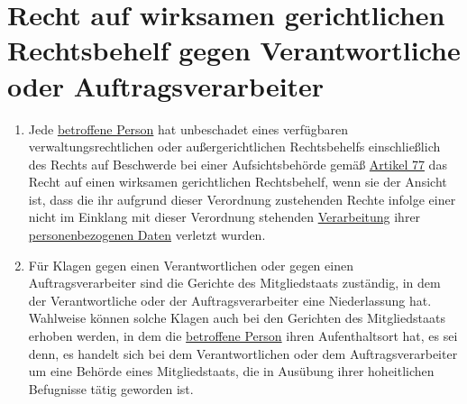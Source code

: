 \chapter{Recht auf wirksamen gerichtlichen Rechtsbehelf gegen Verantwortliche oder Auftragsverarbeiter}
\label{ch:79}


\begin{enumerate}

  \item Jede \hyperref[itm:04-1]{betroffene Person} hat unbeschadet eines verfügbaren verwaltungsrechtlichen oder außergerichtlichen
   Rechtsbehelfs einschließlich des Rechts auf Beschwerde bei einer Aufsichtsbehörde gemäß \hyperref[ch:77]{Artikel 77}
   das Recht auf einen wirksamen gerichtlichen Rechtsbehelf, wenn sie der Ansicht ist, dass die ihr aufgrund dieser
   Verordnung zustehenden Rechte infolge einer nicht im Einklang mit dieser Verordnung stehenden \hyperref[itm:04-2]{Verarbeitung} ihrer
   \hyperref[itm:04-1]{personenbezogenen Daten} verletzt wurden.
  \label{itm:79-1}

  \item Für Klagen gegen einen Verantwortlichen oder gegen einen Auftragsverarbeiter sind die Gerichte des
   Mitgliedstaats zuständig, in dem der Verantwortliche oder der Auftragsverarbeiter eine Niederlassung hat. Wahlweise
   können solche Klagen auch bei den Gerichten des Mitgliedstaats erhoben werden, in dem die \hyperref[itm:04-1]{betroffene Person} ihren
   Aufenthaltsort hat, es sei denn, es handelt sich bei dem Verantwortlichen oder dem Auftragsverarbeiter um eine
   Behörde eines Mitgliedstaats, die in Ausübung ihrer hoheitlichen Befugnisse tätig geworden ist.
  \label{itm:79-2}

\end{enumerate}


